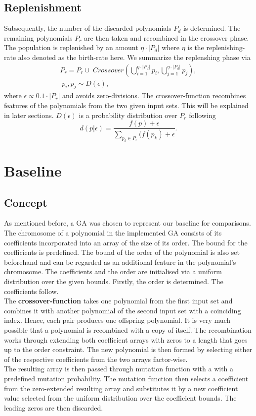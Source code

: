 \documentclass[11pt,a4paper]{article}
\begin{document}
\subsection*{Replenishment}
Subsequently, the number of the discarded polynomials $P_d$ is determined. The remaining polynomials $P_r$ are then taken and recombined in the crossover phase. The population is replenished by an amount $\eta \cdot |P_d|$ where $\eta$ is the replenishing-rate also denoted as the birth-rate here. We summarize the replenshing phase via
\begin{align*}
P_r = P_r \cup \; Crossover \left(\bigcup_{i=1}^{\eta \cdot |P_d|} p_i, \bigcup_{j=1}^{\eta \cdot |P_d|} p_j\right), \\ \; p_i, p_j \sim D(\epsilon),
\end{align*}
where $\epsilon \propto 0.1 \cdot |P_r|$ and avoids zero-divisions. The crossover-function recombines features of the polynomials from the two given input sets. This will be explained in later sections. $D(\epsilon)$ is a probability distribution over $P_r$ following 
\[ 
d(p|\epsilon)= \frac{f(p)+\epsilon}{\sum_{p_k \in P_r} (f(p_k) + \epsilon}.
\]
\section*{Baseline}
\subsection*{Concept}
As mentioned before, a GA was chosen to represent our baseline for comparisons. \\
The chromosome of a polynomial in the implemented GA consists of its coefficients incorporated into an array of the size of its order. The bound for the coefficients is predefined. The bound of the order of the polynomial is also set beforehand and can be regarded as an additional feature in the polynomial's chromosome. The coefficients and the order are initialised via a uniform distribution over the given bounds. Firstly, the order is determined. The coefficients follow. \\
The {\bf crossover-function} takes one polynomial from the first input set and combines it with another polynomial of the second input set with a coinciding index. Hence, each pair produces one offspring polynomial. It is very much possible that a polynomial is recombined with a copy of itself. The recombination works through extending both coefficient arrays with zeros to a length that goes up to the order constraint. The new polynomial is then formed by selecting either of the respective coefficients from the two arrays factor-wise. \\
The resulting array is then passed through mutation function with a with a predefined mutation probability. The mutation function then selects a coefficient from the zero-extended resulting array and substitutes it by a new coefficient value selected from the uniform distribution over the coefficient bounds. The leading zeros are then discarded.
\end{document}
